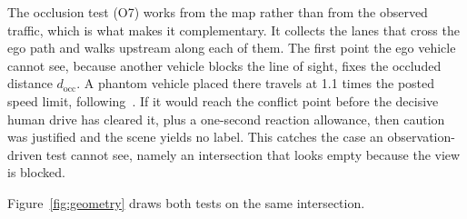 \documentclass[conference]{IEEEtran}
\begin{document}
The occlusion test (O7) works from the map rather than from the observed
traffic, which is what makes it complementary. It collects the lanes that cross
the ego path and walks upstream along each of them. The first point the ego
vehicle cannot see, because another vehicle blocks the line of sight, fixes the
occluded distance $d_\mathrm{occ}$. A phantom vehicle placed there travels at
1.1 times the posted speed limit, following~\cite{orzechowski2018}. If it would reach the conflict point
before the decisive human drive has cleared it, plus a one-second reaction
allowance, then caution was justified and the scene yields no label. This
catches the case an observation-driven test cannot see, namely an intersection
that looks empty because the view is blocked.

Figure~\ref{fig:geometry} draws both tests on the same intersection.
\end{document}

